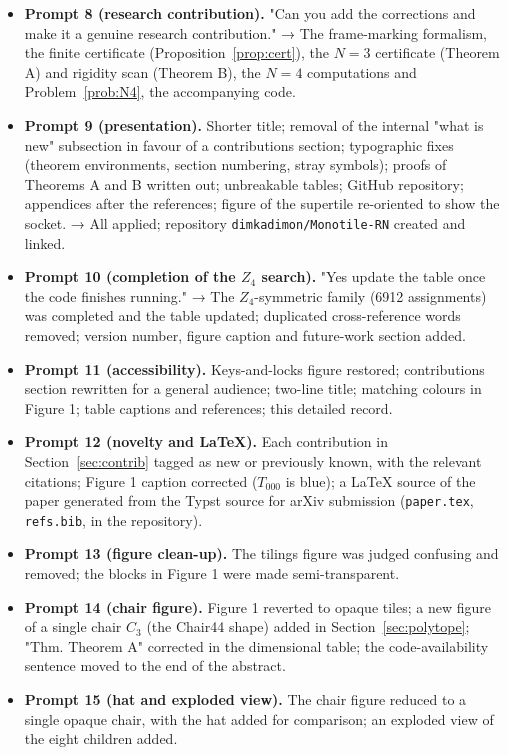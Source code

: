 \documentclass[11pt,a4paper]{article}
\theoremstyle{plain}
\theoremstyle{definition}
\begin{document}
\begin{itemize}
\item \textbf{Prompt 8 (research contribution).} "Can you add the corrections and make it a genuine research contribution." → The frame-marking formalism, the finite certificate (Proposition~\ref{prop:cert}), the $N = 3$ certificate (Theorem A) and rigidity scan (Theorem B), the $N = 4$ computations and Problem~\ref{prob:N4}, the accompanying code.
\item \textbf{Prompt 9 (presentation).} Shorter title; removal of the internal "what is new" subsection in favour of a contributions section; typographic fixes (theorem environments, section numbering, stray symbols); proofs of Theorems A and B written out; unbreakable tables; GitHub repository; appendices after the references; figure of the supertile re-oriented to show the socket. → All applied; repository \texttt{dimkadimon/Monotile-RN} created and linked.
\item \textbf{Prompt 10 (completion of the $Z_4$ search).} "Yes update the table once the code finishes running." → The $Z_4$-symmetric family (6912 assignments) was completed and the table updated; duplicated cross-reference words removed; version number, figure caption and future-work section added.
\item \textbf{Prompt 11 (accessibility).} Keys-and-locks figure restored; contributions section rewritten for a general audience; two-line title; matching colours in Figure 1; table captions and references; this detailed record.

\item \textbf{Prompt 12 (novelty and LaTeX).} Each contribution in Section~\ref{sec:contrib} tagged as new or previously known, with the relevant citations; Figure 1 caption corrected ($T_{000}$ is blue); a LaTeX source of the paper generated from the Typst source for arXiv submission (\texttt{paper.tex}, \texttt{refs.bib}, in the repository).

\item \textbf{Prompt 13 (figure clean-up).} The tilings figure was judged confusing and removed; the blocks in Figure 1 were made semi-transparent.

\item \textbf{Prompt 14 (chair figure).} Figure 1 reverted to opaque tiles; a new figure of a single chair $C_3$ (the Chair44 shape) added in Section~\ref{sec:polytope}; "Thm. Theorem A" corrected in the dimensional table; the code-availability sentence moved to the end of the abstract.

\item \textbf{Prompt 15 (hat and exploded view).} The chair figure reduced to a single opaque chair, with the hat added for comparison; an exploded view of the eight children added.


\end{itemize}
\end{document}
